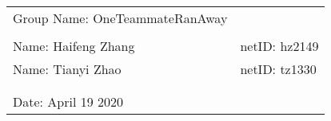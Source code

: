 \documentclass[a4paper,12pt]{article}
\begin{document}
\begin{spacing}{1.3}%
\vspace*{0.25cm}

\hrulefill

\thispagestyle{empty}

\begin{center}
\begin{large}
\end{large}

\hrulefill

\vspace*{2cm}

\begin{large}
\end{large}
\vspace*{2cm}

\begin{large}
\end{large}

\end{center}

\vfill

\begin{table}[h!]
\begin{center}
\begin{tabular}{ll}
	Group Name:  OneTeammateRanAway\hspace*{2em} & \\
	&\\
	
	Name: Haifeng Zhang \hspace*{2em}&
	netID: hz2149\\
	
Name: Tianyi Zhao \hspace*{2em}&
netID: tz1330\\

 \hspace*{2em} \\
 \\

Date: April 19 2020


\end{tabular}
\end{center}
\end{table}


\end{spacing}
\end{document}
